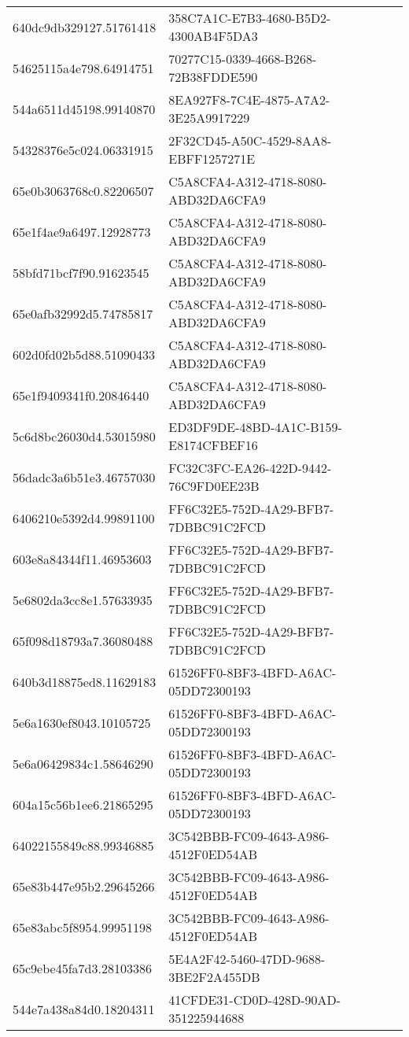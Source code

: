 \begin{tabular}{ll}
640dc9db329127.51761418 & 358C7A1C-E7B3-4680-B5D2-4300AB4F5DA3 \\
54625115a4e798.64914751 & 70277C15-0339-4668-B268-72B38FDDE590 \\
544a6511d45198.99140870 & 8EA927F8-7C4E-4875-A7A2-3E25A9917229 \\
54328376e5c024.06331915 & 2F32CD45-A50C-4529-8AA8-EBFF1257271E \\
65e0b3063768c0.82206507 & C5A8CFA4-A312-4718-8080-ABD32DA6CFA9 \\
65e1f4ae9a6497.12928773 & C5A8CFA4-A312-4718-8080-ABD32DA6CFA9 \\
58bfd71bcf7f90.91623545 & C5A8CFA4-A312-4718-8080-ABD32DA6CFA9 \\
65e0afb32992d5.74785817 & C5A8CFA4-A312-4718-8080-ABD32DA6CFA9 \\
602d0fd02b5d88.51090433 & C5A8CFA4-A312-4718-8080-ABD32DA6CFA9 \\
65e1f9409341f0.20846440 & C5A8CFA4-A312-4718-8080-ABD32DA6CFA9 \\
5c6d8bc26030d4.53015980 & ED3DF9DE-48BD-4A1C-B159-E8174CFBEF16 \\
56dadc3a6b51e3.46757030 & FC32C3FC-EA26-422D-9442-76C9FD0EE23B \\
6406210e5392d4.99891100 & FF6C32E5-752D-4A29-BFB7-7DBBC91C2FCD \\
603e8a84344f11.46953603 & FF6C32E5-752D-4A29-BFB7-7DBBC91C2FCD \\
5e6802da3cc8e1.57633935 & FF6C32E5-752D-4A29-BFB7-7DBBC91C2FCD \\
65f098d18793a7.36080488 & FF6C32E5-752D-4A29-BFB7-7DBBC91C2FCD \\
640b3d18875ed8.11629183 & 61526FF0-8BF3-4BFD-A6AC-05DD72300193 \\
5e6a1630ef8043.10105725 & 61526FF0-8BF3-4BFD-A6AC-05DD72300193 \\
5e6a06429834c1.58646290 & 61526FF0-8BF3-4BFD-A6AC-05DD72300193 \\
604a15c56b1ee6.21865295 & 61526FF0-8BF3-4BFD-A6AC-05DD72300193 \\
64022155849c88.99346885 & 3C542BBB-FC09-4643-A986-4512F0ED54AB \\
65e83b447e95b2.29645266 & 3C542BBB-FC09-4643-A986-4512F0ED54AB \\
65e83abc5f8954.99951198 & 3C542BBB-FC09-4643-A986-4512F0ED54AB \\
65c9ebe45fa7d3.28103386 & 5E4A2F42-5460-47DD-9688-3BE2F2A455DB \\
544e7a438a84d0.18204311 & 41CFDE31-CD0D-428D-90AD-351225944688 \\

\end{tabular}
